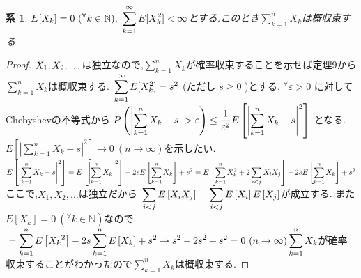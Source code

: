 \documentclass{jsarticle}
\newtheorem{cor}[thm]{系}
\begin{document}
\begin{cor}
$\displaystyle \\ E[X_{k}] = 0 \ ( {}^\forall k \in \mathbb{N} ), \ \sum_{k=1}^{\infty}E[X_{k}^{2}] < \infty$とする.このとき$\displaystyle \sum_{k=1}^{n}X_{ k }$は概収束する.
\end{cor}
\begin{proof}
$\displaystyle \\ X_{1}, X_{2}, \dots$は独立なので,$\displaystyle \sum_{k=1}^{n}X_{ k }$が確率収束することを示せば定理9から$\displaystyle \sum_{k=1}^{n}X_{ k }$は概収束する.
$\displaystyle \\ \sum_{k=1}^{\infty}E[X_{k}^{2}] = s^{2}$ (ただし $s \ge 0$ )とする. ${}^\forall \varepsilon > 0$ に対してChebyshevの不等式から $\displaystyle \\ P\left( \left| \sum_{k=1}^{n}X_{ k } - s \right| > \varepsilon \right) \le \frac{1}{ \varepsilon ^ {2} } E\left[ \left| \sum_{k=1}^{n}X_{ k } - s \right|^{2} \right]$ となる.
$\displaystyle E\left[ \left| \sum_{k=1}^{n}X_{ k } - s \right|^{2} \right] \to 0 \ (n \to \infty )$を示したい. $\displaystyle \\ E\left[ \left| \sum_{k=1}^{n}X_{ k } - s \right|^{2} \right] = E\left[ \left| \sum_{k=1}^{n}X_{ k } \right|^{2} \right] -2sE\left[ \sum_{k=1}^{n}X_{ k } \right] + s^{2} \\ = E\left[ \sum_{k=1}^{n}X_{ k }^{2} + 2 \sum_{i<j}X_{ i }X_{ j }  \right]-2sE\left[ \sum_{k=1}^{n}X_{ k } \right] + s^{2} $ここで,$\displaystyle X_{1}, X_{2}, \dots$は独立だから 
$\displaystyle \\ \sum_{i<j} E\left[ X_{ i }X_{ j }  \right] = \sum_{i<j} E\left[ X_{ i } \right] E\left[X_{ j }  \right]$が成立する. また$\displaystyle E[X_{k}] = 0 \ ( {}^\forall k \in \mathbb{N} )$なので
$\displaystyle \\ = \sum_{k=1}^{n} E\left[ {X_{ k }}^{2} \right] -2s\sum_{k=1}^{n} E\left[ X_{ k } \right] + s^{2} \to s^{2} -2s^{2}+s^{2}=0 \ (n \to \infty) \\ \sum_{k=1}^{n}X_{ k }$が確率収束することがわかったので$\displaystyle \sum_{k=1}^{n}X_{ k }$は概収束する.
\end{proof}
\end{document}
